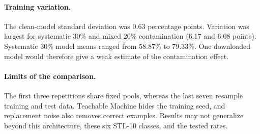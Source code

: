 \paragraph{Training variation.}
The clean-model standard deviation was 0.63 percentage points. Variation was
largest for systematic 30\% and mixed 20\% contamination (6.17 and 6.08
points). Systematic 30\% model means ranged from 58.87\% to 79.33\%. One
downloaded model would therefore give a weak estimate of the contamination
effect.

\paragraph{Limits of the comparison.}
The first three repetitions share fixed pools, whereas the last seven resample
training and test data. Teachable Machine hides the training seed, and
replacement noise also removes correct examples. Results may not generalize
beyond this architecture, these six STL-10 classes, and the tested rates.
